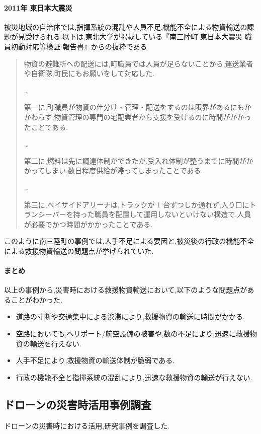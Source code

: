 \documentclass{article}[jsarticle]
\begin{document}
\paragraph{2011年 東日本大震災}
被災地域の自治体では,指揮系統の混乱や人員不足,機能不全による物資輸送の課題が見受けられる.以下は,東北大学が掲載している『南三陸町 東日本大震災 職員初動対応等検証 報告書』からの抜粋である.
\begin{quote}
    物資の避難所への配送には,町職員では人員が足らないことから,運送業者や自衛隊,町民にもお願いをして対応した.\par 
    \ldots \par
    第一に,町職員が物資の仕分け・管理・配送をするのは限界があるにもかかわらず,物資管理の専門の宅配業者から支援を受けるのに時間がかかったことである.\par 
    \ldots \par
    第二に,燃料は先に調達体制ができたが,受入れ体制が整うまでに時間がかかってしまい,数日程度供給が滞ってしまったことである.\par
    \ldots \par
    第三に,ベイサイドアリーナは,トラックが 1 台ずつしか通れず,入り口にトランシーバーを持った職員を配置して運用しないといけない構造で,人員が必要でかつ時間がかかったことである.
\end{quote}
このように南三陸町の事例では,人手不足による要因と,被災後の行政の機能不全による救援物資輸送の問題点が挙げられていた.
\paragraph{まとめ}
以上の事例から,災害時における救援物資輸送において,以下のような問題点があることがわかった.
\begin{itemize}
    \item 道路の寸断や交通集中による渋滞により,救援物資の輸送に時間がかかる.
    \item 空路においても,ヘリポート/航空設備の被害や,数の不足により,迅速に救援物資の輸送を行えない.
    \item 人手不足により,救援物資の輸送体制が脆弱である.
    \item 行政の機能不全と指揮系統の混乱により,迅速な救援物資の輸送が行えない.
\end{itemize}

\subsection{ドローンの災害時活用事例調査}
ドローンの災害時における活用,研究事例を調査した.
\end{document}
